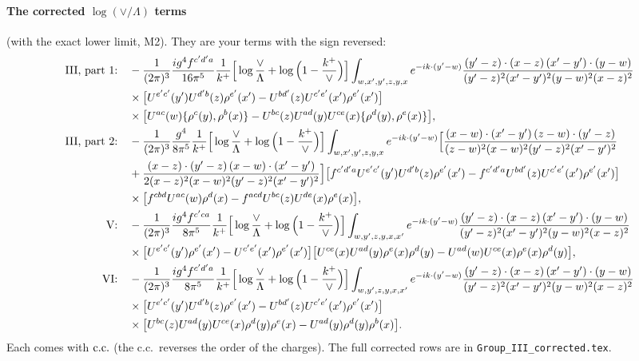 \documentclass[10pt]{article}
\numberwithin{equation}{section}
\begin{document}
\paragraph{The corrected $\log(\vee/\Lambda)$ terms} (with the exact lower limit, M2). They are your terms with the sign reversed:
\begin{align}
\text{III, part 1:}\quad&-\frac{1}{(2\pi)^{3}}\frac{ig^{4}f^{c'd'a}}{16\pi^{5}}\frac{1}{k^{+}}\Big[\log\frac{\vee}{\Lambda}+\log\Big(1-\frac{k^{+}}{\vee}\Big)\Big]\int_{w,x',y',z,y,x}e^{-ik\cdot(y'-w)}\frac{(y'-z)\cdot(x-z)\,(x'-y')\cdot(y-w)}{(y'-z)^{2}(x'-y')^{2}(y-w)^{2}(x-z)^{2}}\notag\\
&\times\big[U^{e'c'}(y')U^{d'b}(z)\rho^{e'}(x')-U^{bd'}(z)U^{c'e'}(x')\rho^{e'}(x')\big]\notag\\&\times\big[U^{ac}(w)\{\rho^{c}(y),\rho^{b}(x)\}-U^{bc}(z)U^{ad}(y)U^{ce}(x)\{\rho^{d}(y),\rho^{e}(x)\}\big],\\
\text{III, part 2:}\quad&-\frac{1}{(2\pi)^{3}}\frac{g^{4}}{8\pi^{5}}\frac{1}{k^{+}}\Big[\log\frac{\vee}{\Lambda}+\log\Big(1-\frac{k^{+}}{\vee}\Big)\Big]\int_{w,x',y',z,y,x}e^{-ik\cdot(y'-w)}\Big[\frac{(x-w)\cdot(x'-y')\,(z-w)\cdot(y'-z)}{(z-w)^{2}(x-w)^{2}(y'-z)^{2}(x'-y')^{2}}\notag\\
&+\frac{(x-z)\cdot(y'-z)\,(x-w)\cdot(x'-y')}{2(x-z)^{2}(x-w)^{2}(y'-z)^{2}(x'-y')^{2}}\Big]\big[f^{c'd'a}U^{e'c'}(y')U^{d'b}(z)\rho^{e'}(x')-f^{c'd'a}U^{bd'}(z)U^{c'e'}(x')\rho^{e'}(x')\big]\notag\\
&\times\big[f^{cbd}U^{ac}(w)\rho^{d}(x)-f^{acd}U^{bc}(z)U^{de}(x)\rho^{e}(x)\big],\\
\text{V:}\quad&-\frac{1}{(2\pi)^{3}}\frac{ig^{4}f^{c'ca}}{8\pi^{5}}\frac{1}{k^{+}}\Big[\log\frac{\vee}{\Lambda}+\log\Big(1-\frac{k^{+}}{\vee}\Big)\Big]\int_{w,y',z,y,x,x'}e^{-ik\cdot(y'-w)}\frac{(y'-z)\cdot(x-z)\,(x'-y')\cdot(y-w)}{(y'-z)^{2}(x'-y')^{2}(y-w)^{2}(x-z)^{2}}\notag\\
&\times\big[U^{e'c'}(y')\rho^{e'}(x')-U^{c'e'}(x')\rho^{e'}(x')\big]\big[U^{ce}(x)U^{ad}(y)\rho^{e}(x)\rho^{d}(y)-U^{ad}(w)U^{ce}(x)\rho^{e}(x)\rho^{d}(y)\big],\\
\text{VI:}\quad&-\frac{1}{(2\pi)^{3}}\frac{ig^{4}f^{c'd'a}}{8\pi^{5}}\frac{1}{k^{+}}\Big[\log\frac{\vee}{\Lambda}+\log\Big(1-\frac{k^{+}}{\vee}\Big)\Big]\int_{w,y',z,y,x,x'}e^{-ik\cdot(y'-w)}\frac{(y'-z)\cdot(x-z)\,(x'-y')\cdot(y-w)}{(y'-z)^{2}(x'-y')^{2}(y-w)^{2}(x-z)^{2}}\notag\\
&\times\big[U^{e'c'}(y')U^{d'b}(z)\rho^{e'}(x')-U^{bd'}(z)U^{c'e'}(x')\rho^{e'}(x')\big]\notag\\&\times\big[U^{bc}(z)U^{ad}(y)U^{ce}(x)\rho^{d}(y)\rho^{e}(x)-U^{ad}(y)\rho^{d}(y)\rho^{b}(x)\big].
\end{align}
Each comes with ${\rm c.c.}$ (the c.c.\ reverses the order of the charges). The full corrected rows are in \texttt{Group\_III\_corrected.tex}.
\end{document}
